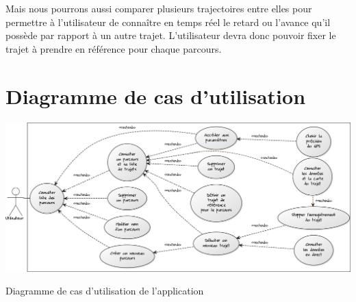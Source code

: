 Mais nous pourrons aussi comparer plusieurs trajectoires entre elles pour permettre à l'utilisateur de connaître en temps réel le retard ou l'avance qu'il possède par rapport à un autre trajet. L'utilisateur devra donc pouvoir fixer le trajet à prendre en référence pour chaque parcours.

\section{Diagramme de cas d'utilisation}
\begin{img}
  \includegraphics{img/DUC.png}
  \caption{Diagramme de cas d'utilisation de l'application}
\end{img}